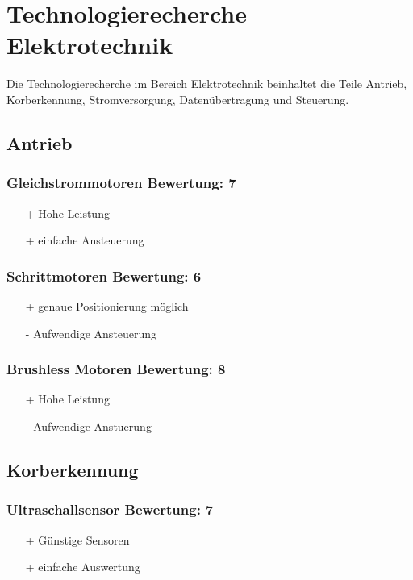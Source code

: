 \section{Technologierecherche Elektrotechnik}
Die Technologierecherche im Bereich Elektrotechnik beinhaltet die Teile 
Antrieb, Korberkennung, Stromversorgung, Datenübertragung und Steuerung. 

\subsection{Antrieb}

\subsubsection{Gleichstrommotoren \hfill Bewertung: 7}
\begin{itemize}
    \item[+] Hohe Leistung
    \item[+] einfache Ansteuerung
\end{itemize}

\subsubsection{Schrittmotoren \hfill Bewertung: 6}
\begin{itemize}
    \item[+] genaue Positionierung möglich
    \item[-] Aufwendige Ansteuerung
\end{itemize}

\subsubsection{Brushless Motoren \hfill Bewertung: 8}
\begin{itemize}
    \item[+] Hohe Leistung
    \item[-] Aufwendige Anstuerung
\end{itemize}

\subsection{Korberkennung}

\subsubsection{Ultraschallsensor \hfill Bewertung: 7}
\begin{itemize}
    \item[+] Günstige Sensoren
    \item[+] einfache Auswertung
\end{itemize}

